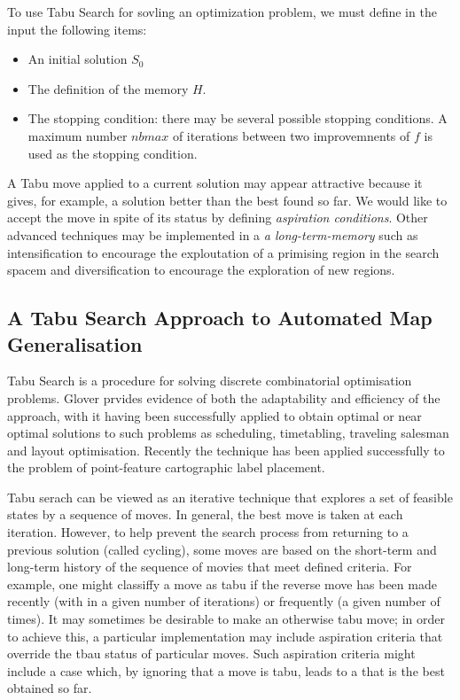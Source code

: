  To use Tabu Search for sovling an optimization problem, we must define in the input the following items:
 \begin{itemize}
 \item An initial solution $S_0$
 \item The definition of the memory $H$.
 \item The stopping condition: there may be several possible stopping conditions. A maximum number $nbmax$ of iterations between two improvemnents of $f$ is used as the stopping condition.
 \end{itemize}

A Tabu move applied to a current solution may appear attractive because it gives, for example, a solution better than the best found so far. We would like to accept the move in spite of its status by defining \emph{aspiration conditions}. Other advanced techniques may be implemented in a \emph{a long-term-memory} such as intensification to encourage the exploutation of a primising region in the search spacem and diversification to encourage the exploration of new regions.

\subsection{A Tabu Search Approach to Automated Map Generalisation}
Tabu Search is a procedure for solving discrete combinatorial optimisation problems. Glover prvides evidence of both the adaptability and efficiency of the approach, with it having been successfully applied to obtain optimal or near optimal solutions to such problems as scheduling, timetabling, traveling salesman and layout optimisation. Recently the technique has been applied successfully to the problem of point-feature cartographic label placement. 

Tabu serach can be viewed as an iterative technique that explores a set of feasible states by a sequence of moves. In general, the best move is taken at each iteration. However, to help prevent the search process from returning to a previous solution (called cycling), some moves are based on the short-term and long-term history of the sequence of movies that meet defined criteria. For example, one might classiffy a move as tabu if the reverse move has been made recently (with in a given number of iterations) or frequently (a given number of times). It may sometimes be desirable to make an otherwise tabu move; in order to achieve this, a particular implementation may include aspiration criteria that override the tbau status of particular moves. Such aspiration criteria might include a case which, by ignoring that a move is tabu, leads to a that is the best obtained so far.

